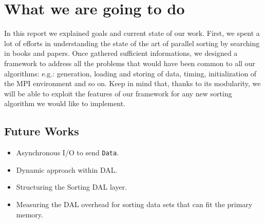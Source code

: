 \label{conclusion}
\section{What we are going to do}
In this report we explained goals and current state of our work. First, we spent a lot of efforts in understanding the state of the art of parallel sorting by searching in books and papers. Once gathered sufficient informations, we designed a framework to address all the problems that would have been common to all our algorithms: e.g.: generation, loading and storing of data, timing, initialization of the MPI environment and so on. Keep in mind that, thanks to its modularity, we will be able to exploit the features of our framework for any new sorting algorithm we would like to implement. 

\subsection{Future Works}
\begin{itemize}
\item Asynchronous I/O to send \texttt{Data}. 
\item Dynamic approach within DAL.
\item Structuring the Sorting DAL layer.
\item Measuring the DAL overhead for sorting data sets that can fit the primary memory.
\end{itemize}
